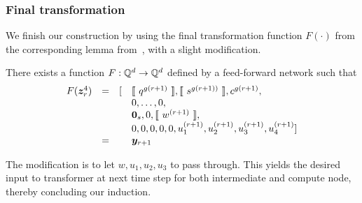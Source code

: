 \subsubsection{Final transformation}
We finish our construction by using the final transformation function $F(\cdot)$ from the corresponding lemma from~\citet{Perez19}, with a slight modification.
\begin{lemma}
\label{lem:yr+1}
There exists a function $F:\mathbb{Q}^d\to \mathbb{Q}^d$ defined by a feed-forward network such that
\begin{equation*}
\begin{array}{rcllr}
F({\bm{z}}^4_r) & = & [ 
& \llbracket\ q^{g(r+1)}\ \rrbracket,\llbracket\ s^{g(r+1))}\ \rrbracket,c^{g(r+1)}, \\
&&& 0,\ldots,0, \\
&&& {\bm{0}}_s,0,\llbracket\ w^{(r+1)}\ \rrbracket, \\
&&& 0,0,0,0,0,{u}_1^{(r+1)}, {u}_2^{(r+1)}, {u}_3^{(r+1)}, {u}_4^{(r+1)} ] \\ 
& = & & {\bm{y}}_{r+1}
\end{array}
\end{equation*}
\end{lemma}
The modification is to let $w, u_1, u_2, u_3$ to pass through.
This yields the desired input to transformer at next time step for both intermediate and compute node, thereby concluding our induction.